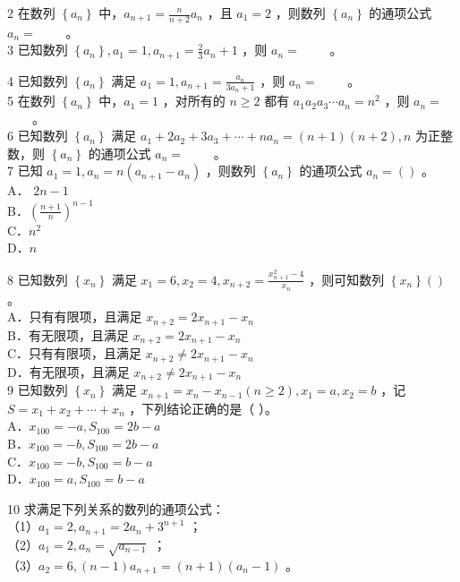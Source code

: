 \documentclass[10pt]{article}
\begin{document}
2 在数列 \(\left\{a_{n}\right\}\) 中，\(a_{n+1}=\frac{n}{n+2} a_{n}\) ，且 \(a_{1}=2\) ，则数列 \(\left\{a_{n}\right\}\) 的通项公式 \(a_{n}=\) \(\qquad\)。\\
3 已知数列 \(\left\{a_{n}\right\}, a_{1}=1, a_{n+1}=\frac{2}{3} a_{n}+1\) ，则 \(a_{n}=\) \(\qquad\)。

4 已知数列 \(\left\{a_{n}\right\}\) 满足 \(a_{1}=1, a_{n+1}=\frac{a_{n}}{3 a_{n}+1}\) ，则 \(a_{n}=\) \(\qquad\)。\\
5 在数列 \(\left\{a_{n}\right\}\) 中，\(a_{1}=1\) ，对所有的 \(n \geqslant 2\) 都有 \(a_{1} a_{2} a_{3} \cdots a_{n}=n^{2}\) ，则 \(a_{n}=\) \(\qquad\)。\\
6 已知数列 \(\left\{a_{n}\right\}\) 满足 \(a_{1}+2 a_{2}+3 a_{3}+\cdots+n a_{n}=(n+1)(n+2), n\) 为正整数，则 \(\left\{a_{n}\right\}\) 的通项公式 \(a_{n}=\) \(\qquad\)。\\
7 已知 \(a_{1}=1, a_{n}=n\left(a_{n+1}-a_{n}\right)\) ，则数列 \(\left\{a_{n}\right\}\) 的通项公式 \(a_{n}=()\) 。\\
A． \(2 n-1\)\\
B．\(\left(\frac{n+1}{n}\right)^{n-1}\)\\
C．\(n^{2}\)\\
D．\(n\)

8 已知数列 \(\left\{x_{n}\right\}\) 满足 \(x_{1}=6, x_{2}=4, x_{n+2}=\frac{x_{n+1}^{2}-4}{x_{n}}\) ，则可知数列 \(\left\{x_{n}\right\}()\) 。\\
A．只有有限项，且满足 \(x_{n+2}=2 x_{n+1}-x_{n}\)\\
B．有无限项，且满足 \(x_{n+2}=2 x_{n+1}-x_{n}\)\\
C．只有有限项，且满足 \(x_{n+2} \neq 2 x_{n+1}-x_{n}\)\\
D．有无限项，且满足 \(x_{n+2} \neq 2 x_{n+1}-x_{n}\)\\
9 已知数列 \(\left\{x_{n}\right\}\) 满足 \(x_{n+1}=x_{n}-x_{n-1}(n \geqslant 2), x_{1}=a, x_{2}=b\) ，记 \(S=x_{1}+x_{2}+\cdots+x_{n}\) ，下列结论正确的是（ ）。\\
A．\(x_{100}=-a, S_{100}=2 b-a\)\\
B．\(x_{100}=-b, S_{100}=2 b-a\)\\
C．\(x_{100}=-b, S_{100}=b-a\)\\
D．\(x_{100}=a, S_{100}=b-a\)

10 求满足下列关系的数列的通项公式：\\
（1）\(a_{1}=2, a_{n+1}=2 a_{n}+3^{n+1}\) ；\\
（2）\(a_{1}=2, a_{n}=\sqrt{a_{n-1}}\) ；\\
（3）\(a_{2}=6,(n-1) a_{n+1}=(n+1)\left(a_{n}-1\right)\) 。
\end{document}
